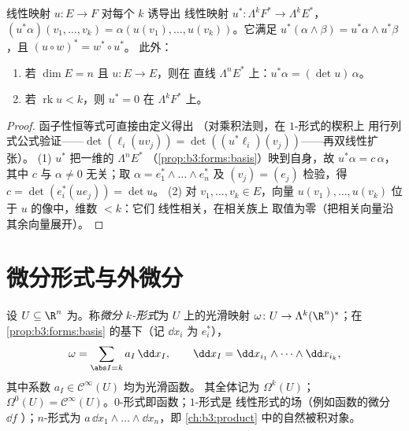 \begin{proposition}[拉回，线性情形]
\label{prop:b3:forms:linearpullback}
线性映射 $u\colon E \to F$ 对每个 $k$ 诱导出
线性映射 $u^*\colon \Lambda^kF^* \to \Lambda^kE^*$，
$(u^*\alpha)(v_1, \dots, v_k) = \alpha(u(v_1), \dots,
u(v_k))$。它满足 $u^*(\alpha \wedge \beta) = u^*\alpha
\wedge u^*\beta$，且 $(u \circ w)^* = w^* \circ u^*$。
此外：
\begin{enumerate}
  \item 若 $\dim E = n$ 且 $u\colon E \to E$，则在
        直线 $\Lambda^nE^*$ 上：$u^*\alpha = (\det u)\,\alpha$。
  \item 若 $\operatorname{rk}u < k$，则 $u^* = 0$ 在
        $\Lambda^kF^*$ 上。
\end{enumerate}
\end{proposition}

\begin{proof}
函子性恒等式可直接由定义得出
（对乘积法则，在 $1$-形式的楔积上
用行列式公式验证——$\det(\ell_i(uv_j)) =
\det((u^*\ell_i)(v_j))$——再双线性扩张）。
(1) $u^*$ 把一维的 $\Lambda^nE^*$
（\cref{prop:b3:forms:basis}）映到自身，故 $u^*\alpha =
c\,\alpha$，其中 $c$ 与 $\alpha \neq 0$ 无关；取
$\alpha = e_1^* \wedge \dots \wedge e_n^*$ 及 $(v_j) =
(e_j)$ 检验，得 $c = \det(e_i^*(ue_j)) = \det u$。
(2) 对 $v_1, \dots, v_k \in E$，向量 $u(v_1), \dots,
u(v_k)$ 位于 $u$ 的像中，维数 $< k$：它们
线性相关，在相关族上
取值为零（把相关向量沿
其余向量展开）。
\end{proof}

\section{微分形式与外微分}

\begin{definition}\label{def:b3:forms:diffform}
设 $U \subseteq \R^n$ 为。称\emph{微分
$k$-形式}为 $U$ 上的光滑映射
$\omega\colon U \to \Lambda^k(\R^n)^*$；在
\cref{prop:b3:forms:basis} 的基下（记 $\dd x_i$ 为
$e_i^*$），
\[
\omega = \sum_{\abs I = k} a_I\,\dd x_I,
\qquad
\dd x_I = \dd x_{i_1} \wedge \dots \wedge \dd x_{i_k},
\]
其中系数 $a_I \in \mathcal C^\infty(U)$ 均为光滑函数。
其全体记为 $\Omega^k(U)$；$\Omega^0(U) = \mathcal
C^\infty(U)$。$0$-形式即函数；$1$-形式是
线性形式的场（例如函数的微分 $\dd f$
）；$n$-形式为 $a\,\dd x_1\wedge\dots\wedge\dd
x_n$，即 \cref{ch:b3:product} 中的自然被积对象。
\end{definition}

